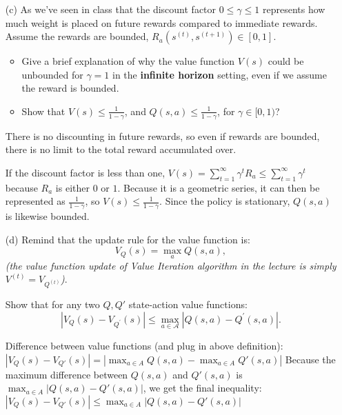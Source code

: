 \documentclass[11pt]{article}
\begin{document}
\begin{enumerate}
\begin{answertext}{3cm}{}
\begin{tikzpicture}[>=stealth, node distance=1.5cm]
        \end{tikzpicture}
            
\end{answertext}

\item [(c)] As we've seen in class that the discount factor $0\leq \gamma \leq 1$ represents how much weight is placed on future rewards compared to immediate rewards. Assume the rewards are bounded, $R_a(s^{(t)}, s^{(t+1)})\in [0,1]$.
\begin{itemize}
\item 
Give a brief explanation of why the value function $V(s)$ could be unbounded for $\gamma=1$ in the \textbf{infinite horizon} setting, even if we assume the reward is bounded. 
\item  
Show that $V(s)\leq \frac{1}{1-\gamma}$, and $Q(s,a)\leq \frac{1}{1-\gamma}$, for $\gamma \in [0,1)$?
\end{itemize} 
\begin{answertext}{4.5cm}{}

There is no discounting in future rewards, so even if rewards are bounded, there is no limit to the total reward accumulated over.

If the discount factor is less than one, $V(s)=\sum_{t=1}^{\infty} \gamma^t R_a \leq \sum_{t=1}^{\infty} \gamma^t$ because $R_a$ is either $0$ or $1$. Because it is a geometric series, it can then be represented as $\frac{1}{1-\gamma}$, so $V(s) \leq \frac{1}{1-\gamma}$. Since the policy is stationary, $Q(s,a)$ is likewise bounded. 

\end{answertext}

\pagebreak
\item [(d)] Remind that the update rule for the value function is:
$$V_Q(s)=\max_a Q(s,a),$$
\textit{(the value function update of Value Iteration algorithm in the lecture is simply $V^{(t)}=V_{Q^{(t)}}$)}.

Show that for any two $Q, Q'$ state-action value functions:
$$\left|V_Q(s)-V_{Q^{\prime}}(s)\right| \leq \max _{a \in \mathcal{A}}\left|Q(s, a)-Q^{\prime}(s, a)\right| .$$ 
\begin{answertext}{4cm}{}

Difference between value functions (and plug in above definition):\\
$|V_Q(s) - V_{Q'}(s)| = |\max_{a\in A}Q(s, a) - \max_{a\in A}Q'(s, a)|$
Because the maximum difference between $Q(s, a)$ and $Q'(s, a)$ is $\max_{a \in A} | Q(s, a) - Q'(s, a)|$, we get the final inequality:\\
$|V_Q(s) - V_{Q'}(s)| \leq \max_{a\in A}|Q(s, a) - Q'(s, a)|$

\end{answertext}
\end{enumerate}

\pagebreak
\end{document}
